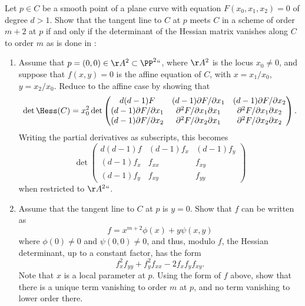 \begin{exercise}\label{Hessian exercise} 
Let $p\in C$ be a smooth point of a  plane curve with equation $F(x_0,x_1,x_2) = 0$ of degree $d>1$. Show that the tangent line to $C$ at $p$ meets
$C$ in a scheme of order $m+2$ at $p$ if and only if the determinant of the Hessian matrix vanishes
%
along $C$ to order $m$ as is done in \cite[pp.~84--85]{Kunz}:

\begin{enumerate}
\item Assume that $p = (0,0)\in \AA^2\subset \PP^2` `$, where $\AA^2$ is the locus $x_0\neq 0$, 
and suppose that $f(x,y) =0$ is the affine equation of $C$, with $x= x_1/x_0$, 
$y = x_2/x_0$.
Reduce to the affine case by showing that
$$
\det \Hess(C) =
x_0^2 \det 
\begin{pmatrix}
 d(d-1)F & (d-1) \partial F/\partial x_1 & (d-1) \partial F/\partial x_2 \\
 (d-1) \partial F/\partial x_1&\partial^2 F/\partial x_1 \partial x_1 & \partial^2 F/\partial x_1 \partial x_2\\
 (d-1) \partial F/\partial x_2 &\partial^2 F/\partial x_2 \partial x_1 & \partial^2 F/\partial x_2 \partial x_2 
\end{pmatrix} .
$$ 
Writing the partial derivatives as subscripts, this becomes
$$
\det \begin{pmatrix}
 d(d-1)f & (d-1) f_x & (d-1) f_y \\
 (d-1) f_x&f_{xx} & f_{xy}\\
 (d-1) f_y &f_{xy} & f_{yy}
\end{pmatrix}
$$ 
when restricted to $\AA^2` `$.

\item Assume that the tangent line to $C$ at $p$ is $y=0$. Show that $f$ can be written as
$$
f = x^{m+2}\phi(x) +y\psi(x,y)
$$
where $\phi(0) \neq 0$ and $\psi(0,0) \neq 0$, and thus, modulo $f$, the Hessian determinant,
up to a constant factor, 
has the form
$$
f_x^2f_{yy}+f_y^2f_{xx}-2f_xf_yf_{xy}.
$$
Note that $x$ is a local parameter at $p$. Using the form of $f$ above, show that there is a unique term vanishing to order $m$ at $p$,
and no term vanishing to lower order there.
\end{enumerate}
\end{exercise}


